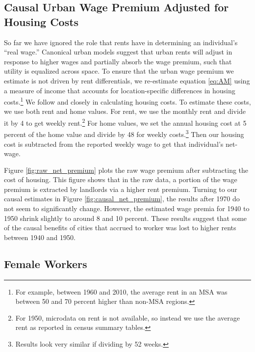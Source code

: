 \documentclass[12pt]{article}
\begin{document}

\subsection*{Causal Urban Wage Premium Adjusted for Housing Costs}

So far we have ignored the role that rents have in determining an individual's ``real wage.''
Canonical urban models suggest that urban rents will adjust in response to higher wages and partially absorb the wage premium, such that utility is equalized across space.  
To ensure that the urban wage premium we estimate is not driven by rent differentials, we re-estimate equation \eqref{eq:AM} using a measure of income that accounts for location-specific differences in housing costs.\footnote{
  For example, between 1960 and 2010, the average rent in an MSA was between 50 and 70 percent higher than non-MSA regions.
}
We follow \citet{ganong2017has} and \citet{hoxie2020moving} closely in calculating housing costs.
To estimate these costs, we use both rent and home values.
For rent, we use the monthly rent and divide it by 4 to get weekly rent.\footnote{For 1950, microdata on rent is not available, so instead we use the average rent as reported in census summary tables.}
For home values, we set the annual housing cost at 5 percent of the home value and divide by 48 for weekly costs.\footnote{Results look very similar if dividing by 52 weeks.}
Then our housing cost is subtracted from the reported weekly wage to get that individual's net-wage.

Figure \ref{fig:raw_net_premium} plots the raw wage premium after subtracting the cost of housing. This figure shows that in the raw data, a portion of the wage premium is extracted by landlords via a higher rent premium. 
Turning to our causal estimates in Figure \ref{fig:causal_net_premium}, the results after 1970 do not seem to significantly change. 
However, the estimated wage premia for 1940 to 1950 shrink slightly to around 8 and 10 percent. 
These results suggest that some of the causal benefits of cities that accrued to worker was lost to higher rents between 1940 and 1950.


\subsection*{Female Workers}\label{sec:female_wage_premium}
\end{document}
